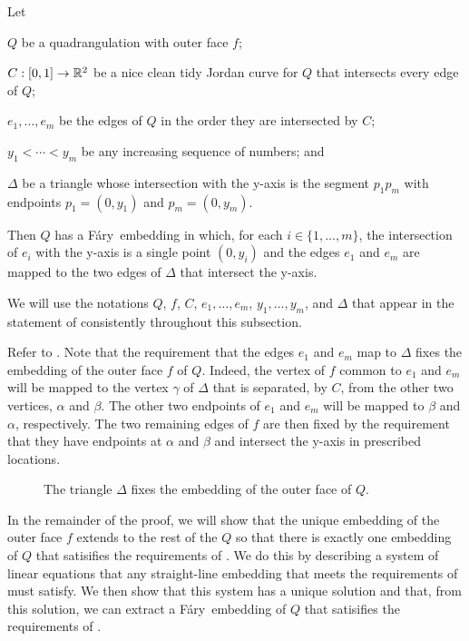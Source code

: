 \documentclass{patmorin}
\newcommand{\Fary}{Fáry}
\begin{document}
\begin{thm}
    Let
    \begin{compactitem}
    \item $Q$ be a quadrangulation with outer face $f$; 
    \item $C:[0,1]\to\mathbb{R}^2$ be a nice clean tidy Jordan curve for $Q$
     that intersects every edge of $Q$;
    \item $e_1,\ldots,e_m$ be the edges of $Q$ in the
    order they are intersected by $C$; 
    \item $y_1<\cdots<y_m$
    be any increasing sequence of numbers; and
    \item $\Delta$ be a triangle whose intersection with the y-axis
     is the segment $p_1p_m$ with endpoints $p_1=(0,y_1)$ and $p_m=(0,y_m)$.
    \end{compactitem}
    Then $Q$ has a \Fary\ embedding in which, for each
    $i\in\{1,\ldots,m\}$, the intersection of $e_i$ with the y-axis is
    a single point $(0,y_i)$ and the edges $e_1$ and $e_m$ are mapped
    to the two edges of $\Delta$ that intersect the y-axis.
\end{thm}

We will use the notations $Q$, $f$, $C$, $e_1,\ldots,e_m$,
$y_1,\ldots,y_m$, and $\Delta$ that appear in the statement of
 consistently throughout this subsection.

Refer to .
Note that the requirement that the edges $e_1$ and $e_m$ map to $\Delta$
fixes the embedding of the outer face $f$ of $Q$. Indeed, the vertex of
$f$ common to $e_1$ and $e_m$ will be mapped to the vertex $\gamma$ of
$\Delta$ that is separated, by $C$, from the other two vertices, $\alpha$
and $\beta$.  The other two endpoints of $e_1$ and $e_m$ will be mapped
to $\beta$ and $\alpha$, respectively.  The two remaining edges of $f$
are then fixed by the requirement that they have endpoints at $\alpha$
and $\beta$ and intersect the y-axis in prescribed locations.

\begin{figure}
   \caption{The triangle $\Delta$ fixes the embedding of the outer face of $Q$.}
\end{figure}

In the remainder of the proof, we will show that the unique embedding
of the outer face $f$ extends to the rest of the $Q$ so that there
is exactly one embedding of $Q$ that satisifies the requirements of
.  We do this by describing a system of linear equations that
any straight-line embedding that meets the requirements of 
must satisfy.  We then show that this system has a unique solution
and that, from this solution, we can extract a \Fary\ embedding of $Q$
that satisifies the requirements of .
\end{document}
